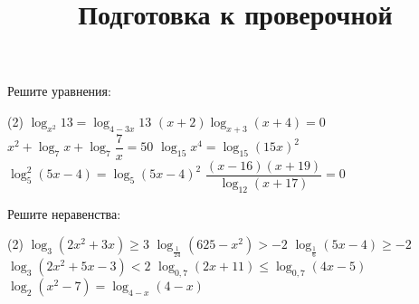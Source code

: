 \begin{class}[number=7]
	\title{Подготовка к проверочной}
	\begin{listofex}
		\item Решите уравнения: %
		\begin{tasks}(2)
			\task \( \log_{x^2}13=\log_{4-3x}13 \)
			\task \( (x+2)\log_{x+3}(x+4)=0 \)
			\task \( x^2+\log_7 x + \log_7 \dfrac{ 7 }{ x }=50 \)
			\task \( \log_{15}x^4=\log_{15}(15x)^2 \)
			\task \( \log_5^2(5x-4)=\log_5 (5x-4)^2 \)
			\task \( \dfrac{ (x-16)(x+19) }{ \log_{12}(x+17) }=0 \)
		\end{tasks}
		\item Решите неравенства: %
		\begin{tasks}(2)
			\task \( \log_3 (2x^2+3x) \ge 3 \)
			\task \( \log_{\tfrac{1}{24}} (625-x^2) > -2 \)
			\task \( \log_{\tfrac{1}{6}}(5x-4) \ge -2 \)
			\task \( \log_3 (2x^2+5x-3) < 2 \)
			\task \( \log_{0,7} (2x+11) \le \log_{0,7} (4x-5) \)
			\task \( \log_2  (x^2-7)=\log_{4-x} (4-x)\)
		\end{tasks}
	\end{listofex}
\end{class}

